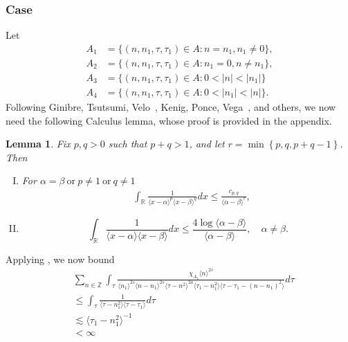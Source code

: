 \documentclass[12pt,reqno]{amsart}
\numberwithin{equation}{section}  %
\renewcommand{\cref}{\Cref}
\newcommand{\rr}{\mathbb{R}}
\newcommand{\zz}{\mathbb{Z}}
\newcommand{\zzdot}{\dot{\zz}}
\newtheorem{lemma}[theorem]{Lemma}
\begin{document}
 \subsubsection{Case \cref{it-6}} 
\label{ssec:case-it-6}
Let 
%
%
\begin{align*}
  A_1&=\{(n, n_1, \tau, \tau_1)\in A: n = n_{1},  n_{1} \neq 0 \},\\
  A_2&=\{(n, n_1, \tau, \tau_1)\in A: n_1=0, n \neq n_{1} \},\\
  A_3&=\{(n, n_1, \tau, \tau_1)\in A: 0 < | n | <  | n_{1}| \} \\
  A_4&=\{(n, n_1, \tau, \tau_1)\in A: 0 < | n_{1} | <  | n| \}.
\end{align*} 
%
%
%
Following Ginibre, Tsutsumi, Velo~\cite{Ginibre:1997jp}, Kenig, Ponce, Vega~\cite{Kenig:1996yn}, and others,
we now need the following Calculus lemma, whose proof is provided in the
appendix.
%
%
%
%
%
%
%
\begin{lemma}
	\label{lem:calc}
 Fix $p, q > 0$ such that $p +q >1$, and let $r =\min\left\{p, q, p+q-1
 \right\}$. Then 
 \begin{enumerate}[(I)]
   \item
For $\alpha=\beta \ \text{or} \ p \neq 1 \ \text{or} \ q \neq 1$
 \begin{equation*}
\begin{split}
  & \int_{\rr} \frac{1}{\langle x - \alpha \rangle ^{p} \langle x -
  \beta \rangle
  ^{q}} d x
  \le \frac{c_{p,q}}{\langle \alpha - \beta \rangle ^{r}}, 
  \end{split}
\end{equation*}
  \item
    \begin{equation*}
  \int_{\rr} \frac{1}{\langle x - \alpha \rangle  \langle x - \beta
  \rangle} d x
  \le  \frac{4 \log \langle \alpha - \beta \rangle}{\langle \alpha - \beta
  \rangle}, \quad \alpha \neq \beta.
\end{equation*}
\end{enumerate}
\end{lemma}
%
%
%
%
%
%
Applying \cref{lem:calc}, we now bound 
\begin{equation*}
  \begin{split}
    & 
    \sum_{n \in \zzdot} \int_{\tau} \frac{\chi_{A_{1}}\langle n \rangle ^{2s} }{\langle n_{1} \rangle ^{2s} \langle n-n_{1} \rangle ^{2s} \langle \tau - n^{2} \rangle^{2a} 
    \langle \tau_{1} - n_{1}^{2} \rangle \langle  \tau - \tau_{1} -
    (n - n_{1})^{2} \rangle}
    d \tau 
    \\
    & \le 
    \int_{\tau} \frac{1}{\langle \tau -
      n_{1}^{2} \rangle \langle
  \tau - \tau_{1}\rangle}d \tau
  \\
  & \lesssim 
  \langle \tau_{1} - n_{1}^{2} \rangle ^{-1} 
  \\
  & < \infty
\end{split}
\end{equation*}
\end{document}

